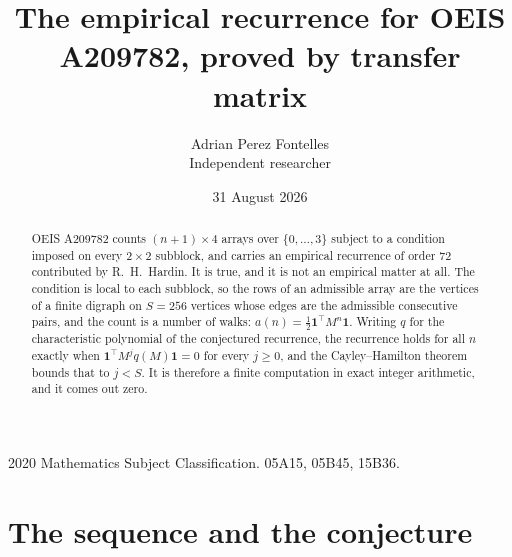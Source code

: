 \documentclass[11pt,a4paper]{article}
\title{The empirical recurrence for OEIS A209782, proved by transfer matrix}
\author{Adrian Perez Fontelles\\ \small Independent researcher}
\date{31 August 2026}
\theoremstyle{plain}
\theoremstyle{definition}
\begin{document}
\maketitle

\begin{abstract}
OEIS A209782 counts $(n+1)\times4$ arrays over $\{0,\dots,3\}$ subject to a condition imposed on
every $2\times2$ subblock, and carries an empirical recurrence of order $72$ contributed
by R.~H.~Hardin. It is true, and it is not an empirical matter at all. The condition is local
to each subblock, so the rows of an admissible array are the vertices of a finite digraph
on $S=256$ vertices whose edges are the admissible consecutive pairs, and the count is a
number of walks: $a(n)=\tfrac1{2}\mathbf{1}^{\!\top}M^{n}\mathbf{1}$. Writing $q$
for the characteristic polynomial of the conjectured recurrence, the recurrence holds for all
$n$ exactly when $\mathbf{1}^{\!\top}M^{j}q(M)\mathbf{1}=0$ for every $j\ge0$, and the
Cayley--Hamilton theorem bounds that to $j<S$. It is therefore a finite computation in exact
integer arithmetic, and it comes out zero.
\end{abstract}

\noindent\small 2020 Mathematics Subject Classification. 05A15, 05B45, 15B36.\normalsize

\section{The sequence and the conjecture}
\end{document}
